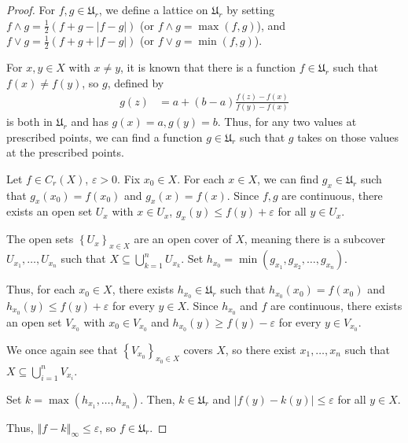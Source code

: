 \documentclass[10pt]{extarticle}
\newcommand{\norm}[1]{\left\Vert #1\right\Vert}
\newcommand{\set}[1]{\left\{#1\right\}}
\newcommand{\ve}{\varepsilon}
\theoremstyle{plain}
\theoremstyle{definition}
\theoremstyle{note}
\renewcommand{\newline}{\hfill\break}
\begin{document}
\begin{proof}
  For $f,g\in \mathfrak{U}_r$, we define a lattice on $\mathfrak{U}_r$ by setting $f\wedge g = \frac{1}{2}\left(f + g - |f-g|\right)$ (or $f\wedge g = \max(f,g)$), and $f\vee g = \frac{1}{2}\left(f + g + |f-g|\right)$ (or $f\vee g = \min(f,g)$).\newline

  For $x,y\in X$ with $x\neq y$, it is known that there is a function $f\in \mathfrak{U}_r$ such that $f(x)\neq f(y)$, so $g$, defined by
  \begin{align*}
    g(z) &= a + \left(b-a\right)\frac{f(z)-f(x)}{f(y)-f(x)}
  \end{align*}
  is both in $\mathfrak{U}_r$ and has $g(x) = a,g(y) = b$. Thus, for any two values at prescribed points, we can find a function $g\in \mathfrak{U}_r$ such that $g$ takes on those values at the prescribed points.\newline

  Let $f\in C_{r}(X)$, $\ve > 0$. Fix $x_0\in X$. For each $x\in X$, we can find $g_x\in \mathfrak{U}_r$ such that $g_x\left(x_0\right) = f(x_0)$ and $g_x(x) = f(x)$. Since $f,g$ are continuous, there exists an open set $U_x$ with $x\in U_x$, $g_x(y)\leq f(y) + \ve$ for all $y\in U_{x}$.\newline

  The open sets $\set{U_x}_{x\in X}$ are an open cover of $X$, meaning there is a subcover $U_{x_1},\dots,U_{x_n}$ such that $X\subseteq \bigcup_{k=1}^{n}U_{x_k}$. Set $h_{x_0} = \min\left(g_{x_1},g_{x_2},\dots,g_{x_n}\right)$.\newline

  Thus, for each $x_0\in X$, there exists $h_{x_0}\in \mathfrak{U}_r$ such that $h_{x_0}\left(x_0\right) = f\left(x_0\right)$ and $h_{x_0}(y)\leq f(y) + \ve$ for every $y\in X$. Since $h_{x_0}$ and $f$ are continuous, there exists an open set $V_{x_0}$ with $x_0 \in V_{x_0}$ and $h_{x_0}(y) \geq f(y) - \ve$ for every $y\in V_{x_0}$.\newline

  We once again see that $\set{V_{x_0}}_{x_0\in X}$ covers $X$, so there exist $x_1,\dots,x_n$ such that $X\subseteq \bigcup_{i=1}^{n}V_{x_i}$.\newline

  Set $k = \max\left(h_{x_1},\dots,h_{x_n}\right)$. Then, $k\in \mathfrak{U}_r$ and $\left\vert f(y)-k(y) \right\vert\leq \ve$ for all $y\in X$.\newline

  Thus, $\norm{f-k}_{\infty}\leq \ve$, so $f\in \mathfrak{U}_r$.
\end{proof}
\end{document}
